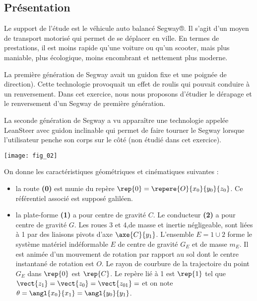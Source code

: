 \setlength{\columnseprule}{.1pt}

\pagestyle{fancy}
\thispagestyle{plain}

\vspace{4.8cm}

\def\columnseprulecolor{\color{ocre}}
\setlength{\columnseprule}{0.4pt} 

\setcounter{exo}{0}
\ifprof
\else
\begin{multicols}{2}
\fi

\section*{Présentation}
\ifprof
\else

Le support de l’étude est le véhicule auto balancé Segway®. Il s’agit d’un moyen de transport motorisé qui permet de se déplacer en ville. En termes de prestations, il est moins rapide qu’une voiture ou qu’un scooter, mais plus maniable, plus écologique, moins encombrant et nettement plus moderne.

	La première génération de Segway avait un guidon fixe et une poignée de direction). Cette technologie provoquait un effet de roulis qui pouvait conduire à un renversement. Dans cet exercice, nous nous proposons d’étudier le dérapage et le renversement d’un Segway de première génération.
	
	La seconde génération de Segway a vu apparaître une technologie appelée LeanSteer avec guidon inclinable qui permet de faire tourner le Segway lorsque l'utilisateur penche son corps sur le côté (non étudié dans cet exercice).

\begin{center}
\texttt{[image: fig\_02]}
\end{center}


On donne les caractéristiques géométriques et cinématiques suivantes :
\begin{itemize}
\item la route \textbf{(0)} est munie du repère $\rep{0}=\repere{O}{x_0}{y_0}{z_0}$. Ce référentiel associé est supposé galiléen.
\item la plate-forme \textbf{(1)} a pour centre de gravité $C$. Le conducteur \textbf{(2)} a pour centre de gravité $G$. Les roues 3 et 4,de masse et inertie négligeable, sont liées à 1 par des liaisons pivots d'axe $\axe{C}{y_1}$. L’ensemble 
$E=1\cup 2$ forme le système matériel indéformable $E$ de centre de gravité $G_E$ et de masse $m_E$. Il est animée d'un mouvement de rotation par rapport au sol dont le centre instantané de rotation est $O$. Le rayon de courbure de la trajectoire du point $G_E$ dans $\rep{0}$ est $\rep{C}$. Le repère lié à 1 est $\rep{1}$  tel que $\vect{z_1}=\vect{z_0}=\vect{z_{01}}=$ et on note $\theta=\angl{x_0}{x_1}=\angl{y_0}{y_1}$. 
\end{itemize}



\end{multicols}
